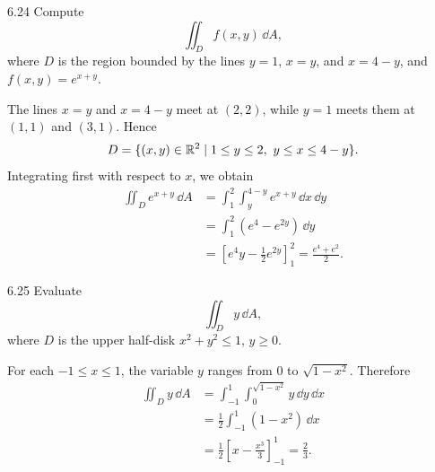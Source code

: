 \documentclass[11pt,oneside]{article}
\begin{document}

\begin{problem}{6.24}
Compute
\[
    \iint_D f(x, y)\,\dd A,
\]
where $D$ is the region bounded by the lines $y=1$, $x=y$, and
$x=4-y$, and $f(x, y)=e^{x+y}$.
\end{problem}
\begin{solution}
The lines $x=y$ and $x=4-y$ meet at $(2, 2)$, while $y=1$ meets
them at $(1, 1)$ and $(3, 1)$. Hence
\[
    D=\{(x, y)\in\R^2\mid 1\le y\le2, \ y\le x\le4-y\}.
\]
Integrating first with respect to $x$, we obtain
\[
\begin{aligned}
    \iint_D e^{x+y}\,\dd A
    &=\int_1^2\int_y^{4-y}e^{x+y}\,\dd x\,\dd y\\
    &=\int_1^2\left(e^4-e^{2y}\right)\,\dd y\\
    &=\left[e^4y-\frac12e^{2y}\right]_1^2
     =\boxed{\frac{e^4+e^2}{2}}.
\end{aligned}
\]
\end{solution}

\begin{problem}{6.25}
Evaluate
\[
    \iint_D y\,\dd A,
\]
where $D$ is the upper half-disk $x^2+y^2\le1$, $y\ge0$.
\end{problem}
\begin{solution}
For each $-1\le x\le1$, the variable $y$ ranges from $0$ to
$\sqrt{1-x^2}$. Therefore
\[
\begin{aligned}
    \iint_D y\,\dd A
    &=\int_{-1}^{1}\int_0^{\sqrt{1-x^2}}y\,\dd y\,\dd x\\
    &=\frac12\int_{-1}^{1}(1-x^2)\,\dd x\\
    &=\frac12\left[x-\frac{x^3}{3}\right]_{-1}^{1}
     =\boxed{\frac23}.
\end{aligned}
\]
\end{solution}
\end{document}
